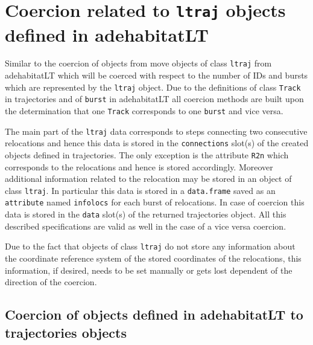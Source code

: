 \documentclass[12pt, oneside, a4paper]{scrbook}
\newcommand{\pkg}[1]{{\normalfont\fontseries{b}\selectfont #1}}
\let\code=\texttt
\newcommand{\codeintitles}[1]{{\tt #1}} %
\begin{document}
\section{Coercion related to \codeintitles{ltraj} objects defined in \pkg{adehabitatLT}}
\label{sec:coercionrelatedtoadeh}

Similar to the coercion of objects from \pkg{move} objects of class \code{ltraj} from \pkg{adehabitatLT} which will be coerced with respect to the number of IDs and bursts which are represented by the \code{ltraj} object. Due to the definitions of class \code{Track} in \pkg{trajectories} and of \code{burst} in \pkg{adehabitatLT} all coercion methods are built upon the determination that one \code{Track} corresponds to one \code{burst} and vice versa.

\par\medskip

The main part of the \code{ltraj} data corresponds to steps connecting two consecutive relocations and hence this data is stored in the \code{connections} slot(s) of the created objects defined in \pkg{trajectories}. The only exception is the attribute \code{R2n} which corresponds to the relocations and hence is stored accordingly. Moreover additional information related to the relocation may be stored in an object of class \code{ltraj}. In particular this data is stored in a \code{data.frame} saved as an \code{attribute} named \code{infolocs} for each burst of relocations. In case of coercion this data is stored in the \code{data} slot(s) of the returned \pkg{trajectories} object. All this described specifications are valid as well in the case of a vice versa coercion.

\par\medskip

Due to the fact that objects of class \code{ltraj} do not store any information about the coordinate reference system of the stored coordinates of the relocations, this information, if desired, needs to be set manually or gets lost dependent of the direction of the coercion.



\subsection*{Coercion of objects defined in \pkg{adehabitatLT} to \pkg{trajectories} objects}
\end{document}
